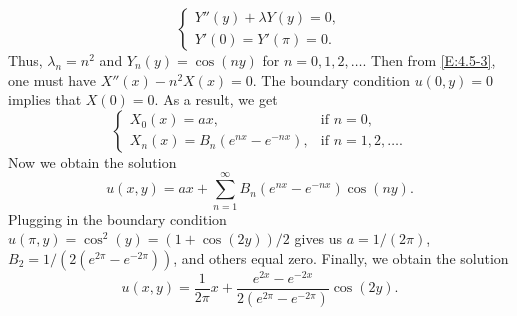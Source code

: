 \begin{enumerate}[label=(\arabic*)]
\[\begin{cases}
                Y''(y) + \lambda Y(y) = 0, \\
                Y'(0) = Y'(\pi) = 0.
            \end{cases}
        \]
        Thus, $\lambda_n=n^2$ and $Y_n(y)=\cos(ny)$ for $n=0,1,2,\ldots$. Then from \eqref{E:4.5-3}, one must have $X''(x)-n^2X(x)=0$. The boundary condition $u(0,y)=0$ implies that $X(0)=0$. As a result, we get
        \[
            \begin{cases}
                X_0(x) = ax, & \text{if $n=0$,} \\
                X_n(x) = B_n(e^{nx}-e^{-nx}), & \text{if $n=1,2,\ldots$}.
            \end{cases}
        \]
        Now we obtain the solution
        \[
            u(x,y) = ax + \sum_{n=1}^\infty B_n(e^{nx}-e^{-nx})\cos(ny).
        \]
        Plugging in the boundary condition $u(\pi,y)=\cos^2(y)=(1+\cos(2y))/2$ gives us $a=1/(2\pi)$, $B_2=1/\left(2(e^{2\pi}-e^{-2\pi})\right)$, and others equal zero. Finally, we obtain the solution
        \[
            u(x,y) = \frac{1}{2\pi}x + \frac{e^{2x}-e^{-2x}}{2(e^{2\pi}-e^{-2\pi})}\cos(2y).
        \]
\end{enumerate}
